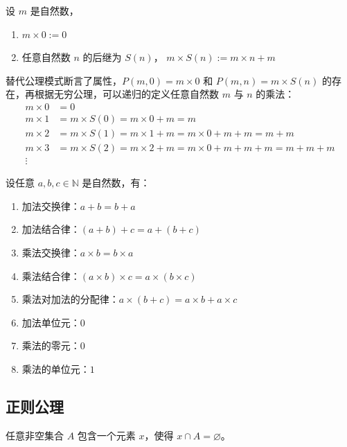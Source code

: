 \begin{definition}[自然数的乘法]
    设 $m$ 是自然数，
    \begin{enumerate}
        \item $ m\times 0:=0 $
        \item 任意自然数 $ n $ 的后继为 $ S(n) $， $m\times S(n):=m\times n+m$
    \end{enumerate}
    \label{def:natural_multiplication}
\end{definition}

\begin{note}
     替代公理模式断言了属性，$P(m,0)=m\times 0$ 和 $P(m,n)=m\times S(n)$ 的存在，再根据无穷公理，可以递归的定义任意自然数 $m$ 与 $n$ 的乘法：
     \begin{align*}
        m\times 0 &= 0\\
        m\times 1 &= m\times S(0) = m\times 0 + m = m\\
        m\times 2 &= m\times S(1) = m\times 1 + m = m\times 0 + m + m= m + m\\
        m\times 3 &= m\times S(2) = m\times 2 + m=  m\times 0 + m + m + m = m + m + m\\
        \vdots
    \end{align*}
\end{note}
\vspace{1em}

\begin{proposition}[自然数的性质]
    设任意 $a,b,c\in\mathbb{N}$ 是自然数，有：
    \begin{enumerate}
        \item 加法交换律：$ a+b = b+a $
        \item 加法结合律：$ (a+b)+c=a+(b+c) $
        \item 乘法交换律：$ a\times b = b\times a $
        \item 乘法结合律：$ (a\times b)\times c=a\times (b\times c) $
        \item 乘法对加法的分配律：$ a\times (b+ c)=a\times b + a\times c $
        \item 加法单位元：$0$
        \item 乘法的零元：$0$
        \item 乘法的单位元：$1$
    \end{enumerate}
\end{proposition}
\vspace{1em}

\subsection{正则公理}
\begin{axiom}
    任意非空集合 $ A $ 包含一个元素 $ x $，使得 $ x\cap A = \varnothing $。
\end{axiom}

